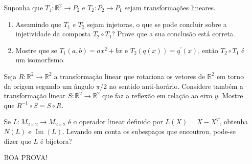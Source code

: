 \documentclass[12pt,a4paper]{article}
\newcommand{\fixme}{{\color{red}(...)}}
\newcommand*\R{\mathbb{R}}
\begin{document}
\begin{ExerciseList}
\Exercise[title={2,5}] Suponha que $T_1: \R^2 \to P_2$ e $T_2: P_2 \to P_1$ sejam transformações lineares.
\begin{enumerate}
\item Assumindo que $T_1$ e $T_2$ sejam injetoras, o que se pode concluir sobre a injetividade da composta $T_2 \circ T_1$? Prove que a sua conclusão está correta.
\item Mostre que se $T_1(a,b) = ax^2 + bx$ e $T_2(q(x)) = q^\prime(x)$, então $T_2 \circ T_1$ é um isomorfismo.
\end{enumerate}
\Answer \fixme

\Exercise[title={2,5}] Seja $R: \R^2 \to \R^2$ a transformação linear que rotaciona os vetores de $\R^2$ em torno da origem segundo um ângulo $\pi/2$ no sentido anti-horário. Considere também a transformação linear $S: \R^2 \to \R^2$ que faz a reflexão em relação ao eixo $y$. Mostre que $R^{-1} \circ S = S \circ R$.
\Answer \fixme

\Exercise[title={2,5}] Se $L: M_{2 \times 2} \to M_{2 \times 2}$ é o operador linear definido por $L(X) = X - X^T$, obtenha $N(L)$ e $\operatorname{Im}(L)$. Levando em conta os subespaços que encoutrou, pode-se dizer que $L$ é bijetora?
\Answer \fixme
\end{ExerciseList}

\begin{center}
BOA PROVA!
\end{center}

\end{document}
